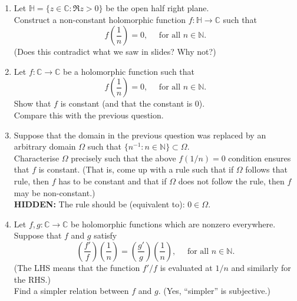 \documentclass[12pt]{article}
\theoremstyle{definition}
\numberwithin{thm}{section}
\newcommand{\hint}[1]{\textbf{HIDDEN:} {\color[rgb]{0.95, 0.95, 0.95}#1}}
\begin{document}
\begin{enumerate}
	\item Let $\mathbb{H} = \{z \in \mathbb{C} : \Re z > 0\}$ be the open half right plane.\\
	Construct a non-constant holomorphic function $f:\mathbb{H} \to \mathbb{C}$ such that
	\begin{equation*} 
		f\left(\dfrac{1}{n}\right) = 0, \quad \text{ for all } n \in \mathbb{N}.
	\end{equation*}
	(Does this contradict what we saw in slides? Why not?)
	\item Let $f:\mathbb{C} \to \mathbb{C}$ be a holomorphic function such that
	\begin{equation*} 
		f\left(\dfrac{1}{n}\right) = 0, \quad \text{ for all } n \in \mathbb{N}.
	\end{equation*}
	Show that $f$ is constant (and that the constant is $0$).\\
	Compare this with the previous question.
	\item Suppose that the domain in the previous question was replaced by an arbitrary domain $\Omega$ such that $\{n^{-1} : n \in \mathbb{N}\} \subset \Omega.$\\
	Characterise $\Omega$ precisely such that the above $f(1/n) = 0$ condition ensures that $f$ is constant. (That is, come up with a rule such that if $\Omega$ follows that rule, then $f$ has to be constant and that if $\Omega$ does not follow the rule, then $f$ may be non-constant.)\\
	\hint{The rule should be (equivalent to): $0 \in \Omega.$}
	\item Let $f, g:\mathbb{C} \to \mathbb{C}$ be holomorphic functions which are nonzero everywhere. Suppose that $f$ and $g$ satisfy
	\begin{equation*} 
		\left(\dfrac{f'}{f}\right)\left(\dfrac{1}{n}\right) = \left(\dfrac{g'}{g}\right)\left(\dfrac{1}{n}\right), \quad \text{ for all } n \in \mathbb{N}.
	\end{equation*}
	(The LHS means that the function $f'/f$ is evaluated at $1/n$ and similarly for the RHS.)\\
	Find a simpler relation between $f$ and $g.$ (Yes, ``simpler'' is subjective.)
\end{enumerate}
\end{document}
